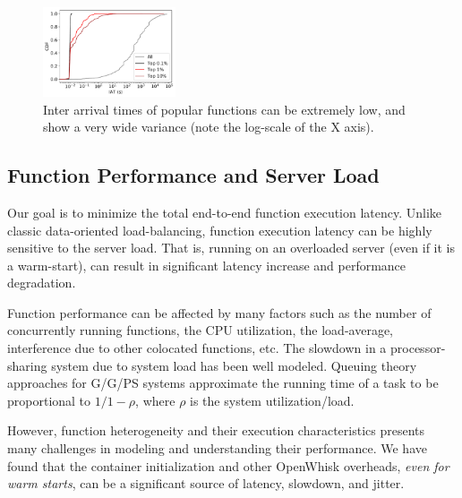 \begin{figure}
  \includegraphics[width=0.35\textwidth]{../figs/iats-all.pdf}
    \vspace*{-0.2cm}
  \caption{Inter arrival times of popular functions can be extremely low, and show a very wide variance (note the log-scale of the X axis).}
  \label{fig:iats}
  \vspace*{-0.2cm}
\end{figure}

\vspace*{-0.2cm}
\subsection{Function Performance and Server Load}
\label{subsec:function-perf}

Our goal is to minimize the total end-to-end function execution latency. 
Unlike classic data-oriented load-balancing, function execution latency can be highly sensitive to the server load.
That is, running on an overloaded server (even if it is a warm-start), can result in significant latency increase and performance degradation.

Function performance can be affected by many factors such as the number of concurrently running functions, the CPU utilization, the load-average, interference due to other colocated functions, etc.
The slowdown in a processor-sharing system due to system load has been well modeled.
Queuing theory approaches for G/G/PS systems approximate the running time of a task to be proportional to $1/1-\rho$, where $\rho$ is the system utilization/load.

However, function heterogeneity and their execution characteristics presents many challenges in modeling and understanding their performance.
We have found that the container initialization and other OpenWhisk overheads, \emph{even for warm starts}, can be a significant source of latency, slowdown, and jitter. 

